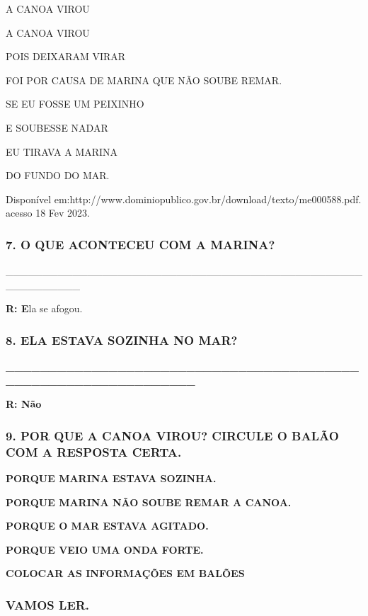 A CANOA VIROU

A CANOA VIROU

POIS DEIXARAM VIRAR

FOI POR CAUSA DE MARINA QUE NÃO SOUBE REMAR.

SE EU FOSSE UM PEIXINHO

E SOUBESSE NADAR

EU TIRAVA A MARINA

DO FUNDO DO MAR.

Disponível
em:http://www.dominiopublico.gov.br/download/texto/me000588.pdf. acesso
18 Fev 2023.

\subsubsection{7. O QUE ACONTECEU COM A
MARINA?}\label{o-que-aconteceu-com-a-marina}

\_\_\_\_\_\_\_\_\_\_\_\_\_\_\_\_\_\_\_\_\_\_\_\_\_\_\_\_\_\_\_\_\_\_\_\_\_\_\_\_\_\_\_\_\_\_\_\_\_\_\_\_\_\_\_\_\_\_

\textbf{R: E}la se afogou.

\subsubsection{8. ELA ESTAVA SOZINHA NO
MAR?}\label{ela-estava-sozinha-no-mar}

\textbf{\_\_\_\_\_\_\_\_\_\_\_\_\_\_\_\_\_\_\_\_\_\_\_\_\_\_\_\_\_\_\_\_\_\_\_\_\_\_\_\_\_\_\_\_\_\_\_\_\_\_\_\_\_\_\_\_\_\_\_\_\_\_\_}

\textbf{R: Não}

\subsubsection{9. POR QUE A CANOA VIROU? CIRCULE O BALÃO COM A RESPOSTA
CERTA.}\label{por-que-a-canoa-virou-circule-o-baluxe3o-com-a-resposta-certa.}

\textbf{PORQUE MARINA ESTAVA SOZINHA.}

\textbf{PORQUE MARINA NÃO SOUBE REMAR A CANOA.}

\textbf{PORQUE O MAR ESTAVA AGITADO.}

\textbf{PORQUE VEIO UMA ONDA FORTE.}

\textbf{COLOCAR AS INFORMAÇÕES EM BALÕES}

\subsubsection{VAMOS LER.}\label{vamos-ler.}

